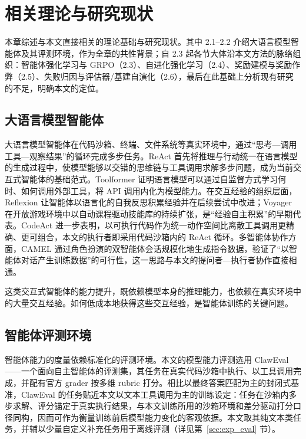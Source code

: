 \chapter{相关理论与研究现状}

本章综述与本文直接相关的理论基础与研究现状。其中 2.1--2.2 介绍大语言模型智能体及其评测环境，作为全章的共性背景；自 2.3 起各节大体沿本文方法的脉络组织：智能体强化学习与 GRPO（2.3）、自进化强化学习（2.4）、奖励建模与奖励作弊（2.5）、失败归因与评估器/基建自演化（2.6），最后在此基础上分析现有研究的不足，明确本文的定位。

\section{大语言模型智能体}

大语言模型智能体在代码沙箱、终端、文件系统等真实环境中，通过“思考—调用工具—观察结果”的循环完成多步任务。ReAct 首先将推理与行动统一在语言模型的生成过程中，使模型能够以交错的思维链与工具调用求解多步问题，成为当前交互式智能体的基础范式。Toolformer 证明语言模型可以通过自监督方式学习何时、如何调用外部工具，将 API 调用内化为模型能力。在交互经验的组织层面，Reflexion 让智能体以语言化的自我反思积累经验并在后续尝试中改进；Voyager 在开放游戏环境中以自动课程驱动技能库的持续扩张，是“经验自主积累”的早期代表。CodeAct 进一步表明，以可执行代码作为统一动作空间比离散工具调用更精确、更可组合，本文的执行者即采用代码沙箱内的 ReAct 循环。多智能体协作方面，CAMEL 通过角色扮演的双智能体会话规模化地生成指令数据，验证了“以智能体对话产生训练数据”的可行性，这一思路与本文的提问者—执行者协作直接相通。

这类交互式智能体的能力提升，既依赖模型本身的推理能力，也依赖在真实环境中的大量交互经验。如何低成本地获得这些交互经验，是智能体训练的关键问题。

\section{智能体评测环境}

智能体能力的度量依赖标准化的评测环境。本文的模型能力评测选用 ClawEval——一个面向自主智能体的评测集，其任务在真实代码沙箱中执行、以工具调用完成，并配有官方 grader 按多维 rubric 打分。相比以最终答案匹配为主的封闭式基准，ClawEval 的任务贴近本文以文本工具调用为主的训练设定：任务在沙箱内多步求解、评分锚定于真实执行结果，与本文训练所用的沙箱环境和差分驱动打分口径同构，因而可作为衡量训练前后模型能力变化的客观依据。本文取其纯文本类任务，并辅以少量自定义补充任务用于离线评测（详见第~\ref{sec:exp_eval} 节）。


